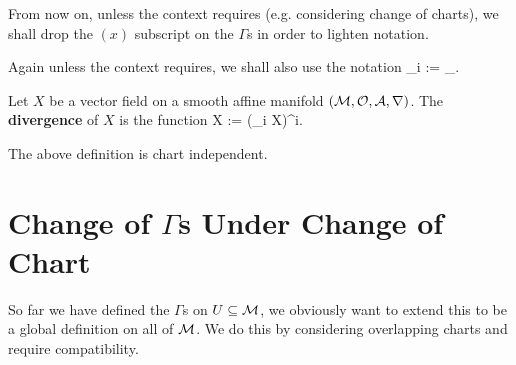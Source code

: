 \bnn 
    \benr 
        \item From now on, unless the context requires (e.g. considering change of charts), we shall drop the $(x)$ subscript on the $\Gamma$s in order to lighten notation.
        \item Again unless the context requires, we shall also use the notation 
        \bse 
            \nabla_i := \nabla_{}.
        \ese 
    \een 
\enn 

    Let $X$ be a vector field on a smooth affine manifold $(\mathcal{M},\mathcal{O},\mathcal{A},\nabla)$. The \textbf{divergence} of $X$ is the function 
    \bse 
        X := (\nabla_i X)^i.
    \ese 
\ed 

\bcl 
    The above definition is chart independent.
\ecl 

\section{\texorpdfstring{Change of $\Gamma$s Under Change of Chart}{Change of Gammas Under Change of Chart}}

So far we have defined the $\Gamma$s on $U\subseteq\mathcal{M}$, we obviously want to extend this to be a global definition on all of $\mathcal{M}$. We do this by considering overlapping charts and require compatibility. 

